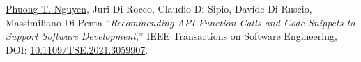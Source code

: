 \documentclass[a4paper,8pt]{article} %
\begin{document}
\begin{thebibliography}{100}
		
	
	

	
	
	
	
	
		
	\underline{Phuong T. Nguyen}, Juri Di Rocco, Claudio Di Sipio, Davide Di Ruscio, Massimiliano Di Penta ``\emph{Recommending API Function Calls and Code Snippets to Support Software Development},'' IEEE Transactions on Software Engineering, DOI: \href{https://doi.org/10.1109/TSE.2021.3059907}{10.1109/TSE.2021.3059907}.%
	
	

\end{thebibliography}
\end{document}
